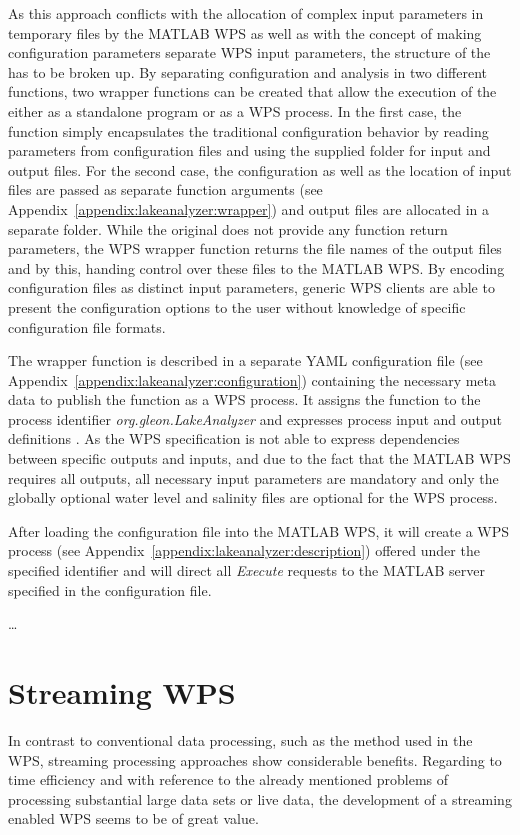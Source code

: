 		As this approach conflicts with the allocation of complex input parameters in temporary files by the MATLAB WPS as well as with the concept of making configuration parameters separate \ac{WPS} input parameters, the structure of the \la has to be broken up. By separating configuration and analysis in two different functions, two wrapper functions can be created that allow the execution of the \la either as a standalone program or as a WPS process. In the first case, the function simply encapsulates the traditional configuration behavior by reading parameters from configuration files and using the supplied folder for input and output files. For the second case, the configuration as well as the location of input files are passed as separate function arguments (see Appendix~\ref{appendix:lakeanalyzer:wrapper}) and output files are allocated in a separate folder. While the original \la does not provide any function return parameters, the WPS wrapper function returns the file names of the output files and by this, handing control over these files to the MATLAB WPS. By encoding configuration files as distinct input parameters, generic WPS clients are able to present the configuration options to the user without knowledge of specific configuration file formats.

		The wrapper function is described in a separate YAML configuration file (see Appendix~\ref{appendix:lakeanalyzer:configuration}) containing the necessary meta data to publish the function as a WPS process. It assigns the function to the process identifier \emph{org.gleon.LakeAnalyzer} and expresses process input and output definitions \citep[taken from the LakeAnalyzer user manual,][]{lamanual}. As the WPS specification is not able to express dependencies between specific outputs and inputs, and due to the fact that the MATLAB WPS requires all outputs, all necessary input parameters are mandatory and only the globally optional water level and salinity files are optional for the WPS process.

		After loading the configuration file into the MATLAB WPS, it will create a WPS process (see Appendix~\ref{appendix:lakeanalyzer:description}) offered under the specified identifier and will direct all \emph{Execute} requests to the MATLAB server specified in the configuration file.

		\dots

\chapter{Streaming WPS}
	In contrast to conventional data processing, such as the method used in the \ac{WPS}, streaming processing approaches show considerable benefits. Regarding to time efficiency and with reference to the already mentioned problems of processing substantial large data sets or live data, the development of a streaming enabled \ac{WPS} seems to be of great value.

